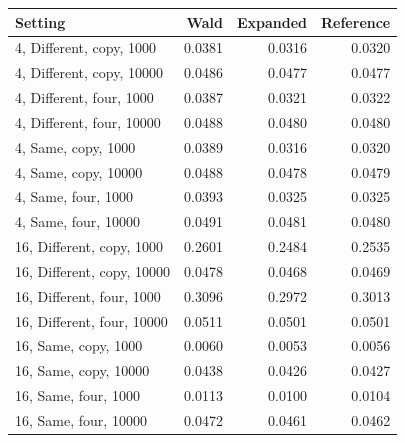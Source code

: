 \begin{tabular}{@{}lrrr@{}}
\toprule
Setting & Wald & Expanded & Reference\\
\midrule
4, Different, copy, 1000 & 0.0381 & 0.0316 & 0.0320\\
4, Different, copy, 10000 & 0.0486 & 0.0477 & 0.0477\\
4, Different, four, 1000 & 0.0387 & 0.0321 & 0.0322\\
4, Different, four, 10000 & 0.0488 & 0.0480 & 0.0480\\
4, Same, copy, 1000 & 0.0389 & 0.0316 & 0.0320\\
4, Same, copy, 10000 & 0.0488 & 0.0478 & 0.0479\\
4, Same, four, 1000 & 0.0393 & 0.0325 & 0.0325\\
4, Same, four, 10000 & 0.0491 & 0.0481 & 0.0480\\
16, Different, copy, 1000 & 0.2601 & 0.2484 & 0.2535\\
16, Different, copy, 10000 & 0.0478 & 0.0468 & 0.0469\\
16, Different, four, 1000 & 0.3096 & 0.2972 & 0.3013\\
16, Different, four, 10000 & 0.0511 & 0.0501 & 0.0501\\
16, Same, copy, 1000 & 0.0060 & 0.0053 & 0.0056\\
16, Same, copy, 10000 & 0.0438 & 0.0426 & 0.0427\\
16, Same, four, 1000 & 0.0113 & 0.0100 & 0.0104\\
16, Same, four, 10000 & 0.0472 & 0.0461 & 0.0462\\
\bottomrule
\end{tabular}
